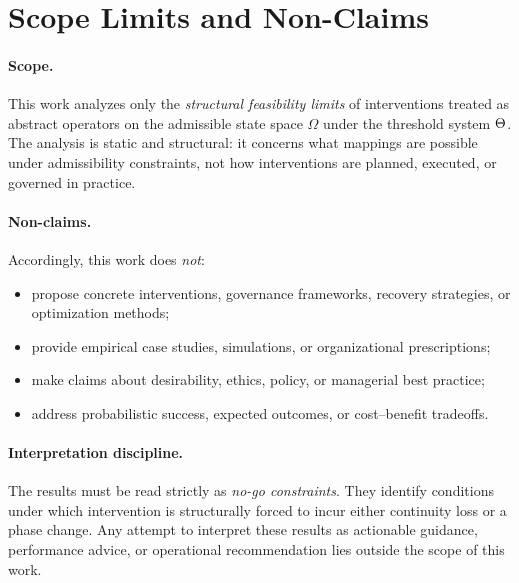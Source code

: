 ﻿\section{Scope Limits and Non-Claims}

\paragraph{Scope.}
This work analyzes only the \emph{structural feasibility limits} of interventions
treated as abstract operators on the admissible state space $\Omega$ under the
threshold system $\Theta$.
The analysis is static and structural: it concerns what mappings are possible
under admissibility constraints, not how interventions are planned, executed, or
governed in practice.

\paragraph{Non-claims.}
Accordingly, this work does \emph{not}:
\begin{itemize}
\item propose concrete interventions, governance frameworks, recovery strategies,
or optimization methods;
\item provide empirical case studies, simulations, or organizational prescriptions;
\item make claims about desirability, ethics, policy, or managerial best practice;
\item address probabilistic success, expected outcomes, or cost--benefit tradeoffs.
\end{itemize}

\paragraph{Interpretation discipline.}
The results must be read strictly as \emph{no-go constraints}.
They identify conditions under which intervention is structurally forced to incur
either continuity loss or a phase change.
Any attempt to interpret these results as actionable guidance, performance advice,
or operational recommendation lies outside the scope of this work.
